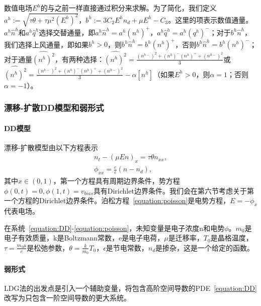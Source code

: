 数值电场$E^{h}$的与之前一样直接通过积分来求解。为了简化，我们定义$a^{h}:=\sqrt{\tau \theta+\tau \mu^{2}\left(E^{h}\right)^{2}}$，$b^{h}:=3 C_{2} E^{h} n_{d}+\mu E^{h}-C_{3}$。这里的$\widehat{}$项表示数值通量。$a^{h} \hat{n}^{h}$和$a^{h} \hat{q}^{h}$选择交替通量，即$a^{h} \hat{n}^{h}=a^{h}\left(n^{h}\right)^{+}$，$a^{h} \hat{q}^{h}=a^{h}\left(q^{h}\right)^{-}$；对于$b^{h} \hat{n}^{h}$，我们选择上风通量，即如果$b^{h}>0$，则$b^{h} \hat{n}^{h}=b^{h}\left(n^{h}\right)^{+}$，否则$b^{h} \hat{n}^{h}=b^{h}\left(n^{h}\right)^{-}$；对于通量$\widehat{\left(n^{h}\right)^{2}}$，有两种选择：$\widehat{\left(n^{h}\right)^{2}}=\frac{\left(n^{h-}\right)^{2}+\left(n^{h}\right)^{-}\left(n^{h}\right)^{+}+\left(n^{h-}\right)^{2}}{3}$或$\widehat{\left(n^{h}\right)^{2}}=\frac{\left(n^{h-}\right)^{2}+\left(n^{h}\right)^{-}\left(n^{h}\right)^{+}+\left(n^{h-}\right)^{2}}{3}-\alpha\left[n^{h}\right]$（如果$E^{h}>0$，则$\alpha=1$；否则$\alpha=-1$）。
\subsubsection{漂移-扩散DD模型和弱形式}
\paragraph{DD模型}
漂移-扩散模型由以下方程表示
\begin{align}
    n_t - (\mu En)_x = \tau \theta n_{xx}, \label{equation:DD} \\
    \phi_{xx} = \frac{e}{\epsilon}(n - n_d),  \label{equation:poisson}
\end{align}
其中$x \in (0,1)$，第一个方程具有周期边界条件，势方程$\phi(0,t) = 0, \phi(1,t) = v_{bias}$具有Dirichlet边界条件。我们会在第六节考虑关于第一个方程的Dirichlet边界条件。泊松方程~\eqref{equation:poisson}是电势方程，$E = -\phi_x$代表电场。

在系统~\eqref{equation:DD}-\eqref{equation:poisson}，未知变量是电子浓度n和电势$\phi$。$m_0$是电子有效质量，k是Boltzmann常数，e是电子电荷，$\mu$是迁移率，$T_0$是晶格温度，$\tau = \frac{m_0 \mu}{e}$是松弛参数，$\theta = \frac{k}{m_0}T_0$，$\epsilon$是节电常数，$n_d$是掺杂，这是一个给定的函数。
\paragraph{弱形式}
LDG法的出发点是引入一个辅助变量，将包含高阶空间导数的PDE~\eqref{equation:DD}改写为只包含一阶空间导数的更大系统。

